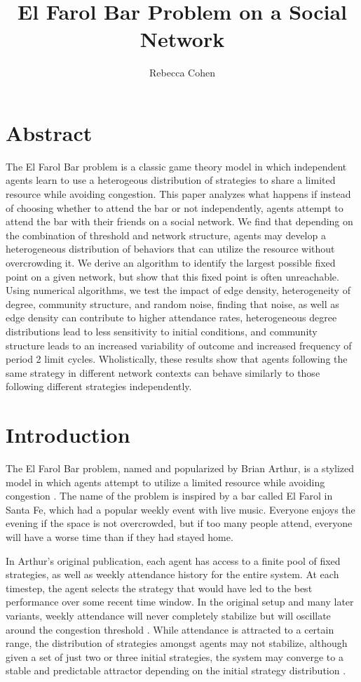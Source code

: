 \documentclass[12pt]{article}
\title{El Farol Bar Problem on a Social Network}
\author{Rebecca Cohen}
\begin{document}
\maketitle
\section{Abstract}
The El Farol Bar problem is a classic game theory model in which independent agents learn to use a heterogeous distribution of strategies to share a limited resource while avoiding congestion.  This paper analyzes what happens if instead of choosing whether to attend the bar or not independently, agents attempt to attend the bar with their friends on a social network.  We find that depending on the combination of threshold and network structure, agents may develop a heterogeneous distribution of behaviors that can utilize the resource without overcrowding it.  We derive an algorithm to identify the largest possible fixed point on a given network, but show that this fixed point is often unreachable.  Using numerical algorithms, we test the impact of edge density, heterogeneity of degree, community structure, and random noise, finding that noise, as well as edge density can contribute to higher attendance rates, heterogeneous degree distributions lead to less sensitivity to initial conditions, and community structure leads to an increased variability of outcome and increased frequency of period 2 limit cycles.  Wholistically, these results show that agents following the same strategy in different network contexts can behave similarly to those following different strategies independently.

\section{Introduction}

The El Farol Bar problem, named and popularized by Brian Arthur, is a stylized model in which agents attempt to utilize a limited resource while avoiding congestion \cite{arthur:1994}.  The name of the problem is inspired by a bar called El Farol in Santa Fe, which had a popular weekly event with live music.  Everyone enjoys the evening if the space is not overcrowded, but if too many people attend, everyone will have a worse time than if they had stayed home.

In Arthur's original publication, each agent has access to a finite pool of fixed strategies, as well as weekly attendance history for the entire system.  At each timestep, the agent selects the strategy that would have led to the best performance over some recent time window.  In the original setup and many later variants, weekly attendance will never completely stabilize but will oscillate around the congestion threshold \cite{arthur:1994} \cite{chen:2012} \cite{zambrano:2004}.  While attendance is attracted to a certain range, the distribution of strategies amongst agents may not stabilize, although given a set of just two or three initial strategies, the system may converge to a stable and predictable attractor depending on the initial strategy distribution \cite{stLuce:2020}.
\end{document}
